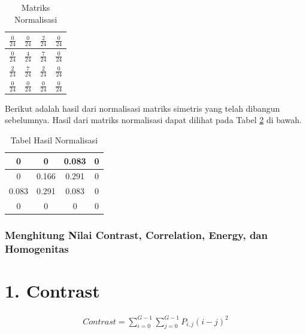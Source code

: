 \begin{table}[H]
\centering
\begin{tabular}{|c|c|c|c|}
\hline
$\frac{0}{24}$ & $\frac{0}{24}$ & $\frac{2}{24}$ & $\frac{0}{24}$ \\
\hline
$\frac{0}{24}$ & $\frac{4}{24}$ & $\frac{7}{24}$ & $\frac{0}{24}$ \\
\hline
$\frac{2}{24}$ & $\frac{7}{24}$ & $\frac{2}{24}$ & $\frac{0}{24}$ \\
\hline
$\frac{0}{24}$ & $\frac{0}{24}$ & $\frac{0}{24}$ & $\frac{0}{24}$ \\
\hline
\end{tabular}
\caption{Matriks Normalisasi}
\label{tab:MatriksNormalisasi}
\end{table}

Berikut adalah hasil dari normalisasi matriks simetris yang telah dibangun sebelumnya. Hasil dari matriks normalisasi dapat dilihat pada Tabel \ref{tab:MatriksNormalisasi} di bawah.
\begin{table}[H]
\centering
\begin{tabular}{|c|c|c|c|}
\hline
0 & 0     & 0.083 & 0     \\
\hline
0 & 0.166 & 0.291 & 0     \\
\hline
0.083 & 0.291 & 0.083 & 0 \\
\hline
0 & 0     & 0     & 0     \\
\hline
\end{tabular}
\caption{Tabel Hasil Normalisasi}
\label{tab:MatriksNormalisasi}
\end{table}

\subsubsection{Menghitung Nilai Contrast, Correlation, Energy, dan Homogenitas} \label{III.Menghitung Nilai Contrast, Correlation, Energy, dan Homogenitas}

\section*{1. Contrast}

\begin{align*}
	\textit{Contrast} = \sum_{i=0}^{G-1} \sum_{j=0}^{G-1} P_{i,j}(i-j)^2
\end{align*}

